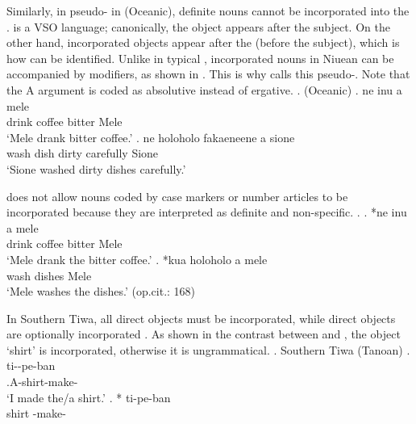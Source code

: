 Similarly, in pseudo- in  (Oceanic),
definite nouns cannot be incorporated into the .
 is a VSO language;
canonically, the object appears after the subject.
On the other hand,
incorporated objects appear after the  (before the subject), which is how  can be identified.
Unlike in typical ,
incorporated nouns in Niuean can be accompanied by modifiers,
as shown in \Next.
This is why  calls this pseudo-.
Note that the A argument  is coded as absolutive instead of ergative.
%
\ex.  (Oceanic)
 \ag. ne inu   a mele \\
       drink coffee bitter  Mele \\
      `Mele drank bitter coffee.'
 \bg. ne holoholo   fakaeneene a sione \\
       wash dish dirty carefully  Sione \\
      `Sione washed dirty dishes carefully.'
  \hfill{\cite[158]{massam01}}

 does not allow nouns coded by case markers or number articles
to be incorporated
because they are interpreted as definite and non-specific.
%
\ex.
 \ag. *ne inu    a mele \\
       drink  coffee bitter  Mele \\
      `Mele drank the bitter coffee.'
 \bg. *kua holoholo   a mele \\
        wash  dishes  Mele \\
       `Mele washes the dishes.'
 \hfill{(op.cit.: 168)}

In Southern Tiwa,
all  direct objects must be incorporated,
while  direct objects are optionally incorporated \cite{allenetal84}.
As shown in the contrast between \Next[a] and \Next[b],
the  object  `shirt' is incorporated,
otherwise it is ungrammatical.
%
\ex. Southern Tiwa (Tanoan)
 \ag. ti--pe-ban \\
      .{\sc A}-shirt-make-\\
      `I made the/a shirt.'
 \bg. * ti-pe-ban \\
      shirt -make-\\
      \hfill{\cite[293]{allenetal84}}

